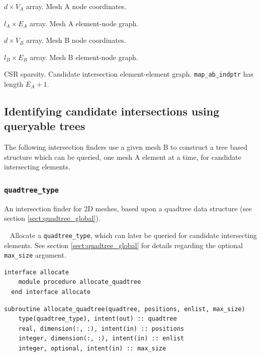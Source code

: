 \documentclass{article}
\begin{document}
\begin{description}[font=\ttfamily\bfseries,leftmargin=2.2\parindent,labelindent=1.7\parindent,noitemsep]
  \item[positions\_a] $d \times V_A$ array. Mesh A node coordinates.
  \item[enlist\_a] $l_A \times E_A$ array. Mesh A element-node graph.
  \item[positions\_b] $d \times V_B$ array. Mesh B node coordinates.
  \item[enlist\_b] $l_B \times E_B$ array. Mesh B element-node graph.
  \item[map\_ab\_indices, map\_ab\_indptr] CSR sparsity. Candidate intersection
    element-element graph. \linebreak \verb+map_ab_indptr+ has length $E_A + 1$.
\end{description}

\subsection{Identifying candidate intersections using queryable trees}

The following intersection finders use a given mesh B to construct a tree based
structure which can be queried, one mesh A element at a time, for candidate
intersecting elements.

\subsubsection{\texttt{quadtree\_type}}\label{sect:quadtree_query}
  
An intersection finder for 2D meshes, based upon a quadtree data structure (see
section \ref{sect:quadtree_global}).

~\newline
Allocate a \verb+quadtree_type+, which can later be queried for candidate
intersecting elements. See section \ref{sect:quadtree_global} for details
regarding the optional \verb+max_size+ argument.

\begin{lstlisting}[language=FORTRAN]
  interface allocate
    module procedure allocate_quadtree
  end interface allocate
\end{lstlisting}
  
\begin{lstlisting}[language=FORTRAN]
  subroutine allocate_quadtree(quadtree, positions, enlist, max_size)
    type(quadtree_type), intent(out) :: quadtree
    real, dimension(:, :), intent(in) :: positions
    integer, dimension(:, :), intent(in) :: enlist
    integer, optional, intent(in) :: max_size 
\end{lstlisting}
\end{document}
